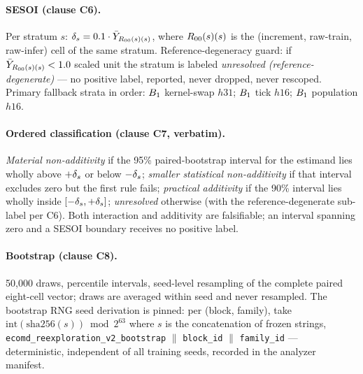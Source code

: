 \paragraph{SESOI (clause C6).}
Per stratum $s$: $\delta_{s} = 0.1 \cdot \bar Y_{R_{00}(s)(s)}$, where
$R_{00}(s)(s)$ is the (increment, raw-train, raw-infer) cell of the same
stratum. Reference-degeneracy guard: if $\bar Y_{R_{00}(s)(s)} < 1.0$ scaled
unit the stratum is labeled \emph{unresolved (reference-degenerate)} --- no
positive label, reported, never dropped, never rescoped. Primary fallback
strata in order: $B_{1}$ kernel-swap $h31$; $B_{1}$ tick $h16$; $B_{1}$
population $h16$.

\paragraph{Ordered classification (clause C7, verbatim).}
\emph{Material non-additivity} if the 95\% paired-bootstrap interval for the
estimand lies wholly above $+\delta_{s}$ or below $-\delta_{s}$; \emph{smaller
statistical non-additivity} if that interval excludes zero but the first rule
fails; \emph{practical additivity} if the 90\% interval lies wholly inside
$[-\delta_{s}, +\delta_{s}]$; \emph{unresolved} otherwise (with the
reference-degenerate sub-label per C6). Both interaction and additivity are
falsifiable; an interval spanning zero and a SESOI boundary receives no
positive label.

\paragraph{Bootstrap (clause C8).}
50{,}000 draws, percentile intervals, seed-level resampling of the complete
paired eight-cell vector; draws are averaged within seed and never resampled.
The bootstrap RNG seed derivation is pinned: per (block, family), take
$\mathrm{int}(\mathrm{sha256}(s)) \bmod 2^{63}$ where $s$ is the
concatenation of frozen strings, \texttt{ecomd\_reexploration\_v2\_bootstrap}
$\|$ \texttt{block\_id} $\|$ \texttt{family\_id} --- deterministic,
independent of all training seeds, recorded in the analyzer manifest.

